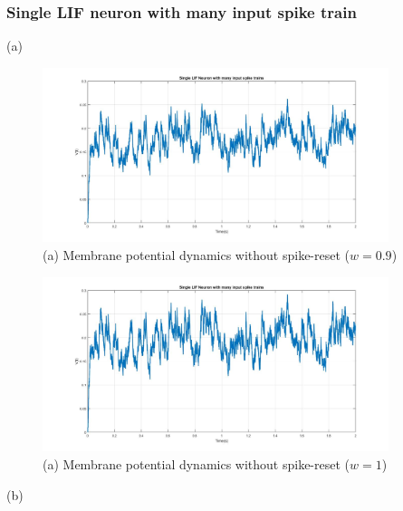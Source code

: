 \documentclass{article}
\begin{document}
\subsubsection{Single LIF neuron with many input spike train}
(a)
\begin{figure}[H] 
	\begin{center}
		\includegraphics[width=0.9\textwidth]{Section2/3a_i.jpg}
		\caption{(a) Membrane potential dynamics without spike-reset ($w = 0.9$)\label{Q2a_iii_g2}}
	\end{center}
\end{figure}
	
\begin{figure}[H] 
		\begin{center}
			\includegraphics[width=0.9\textwidth]{Section2/3a_ii(w1).jpg}
			\caption{(a) Membrane potential dynamics without spike-reset ($w = 1$)\label{Q2a_iii_g2}}
		\end{center}
\end{figure}

(b) 
%
\end{document}
